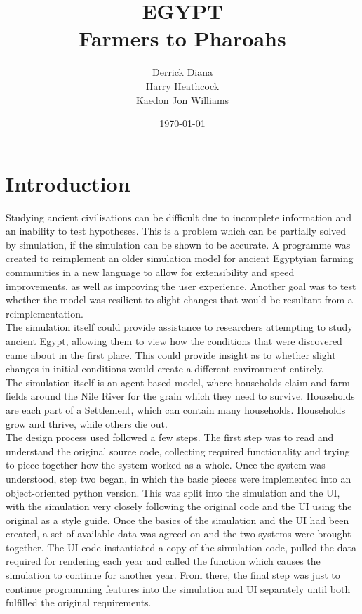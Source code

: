 \documentclass[12pt]{article}
\title{EGYPT\\Farmers to Pharoahs}
\author{Derrick Diana\\Harry Heathcock\\Kaedon Jon Williams}
\date{\today}
\begin{document}
	\maketitle
	\begin{abstract}
			
	\end{abstract}
	
	\section{Introduction}
		Studying ancient civilisations can be difficult due to incomplete information and an inability to test hypotheses. This is a problem which can be partially solved by simulation, if the simulation can be shown to be accurate. A programme was created to reimplement an older simulation model for ancient Egyptyian farming communities in a new language to allow for extensibility and speed improvements, as well as improving the user experience. Another goal was to test whether the model was resilient to slight changes that would be resultant from a reimplementation.\\
		The simulation itself could provide assistance to researchers attempting to study ancient Egypt, allowing them to view how the conditions that were discovered came about in the first place. This could provide insight as to whether slight changes in initial conditions would create a different environment entirely.\\
		The simulation itself is an agent based model, where households claim and farm fields around the Nile River for the grain which they need to survive. Households are each part of a Settlement, which can contain many households. Households grow and thrive, while others die out.\\
		The design process used followed a few steps. The first step was to read and understand the original source code, collecting required functionality and trying to piece together how the system worked as a whole. Once the system was understood, step two began, in which the basic pieces were implemented into an object-oriented python version. This was split into the simulation and the UI, with the simulation very closely following the original code and the UI using the original as a style guide. Once the basics of the simulation and the UI had been created, a set of available data was agreed on and the two systems were brought together. The UI code instantiated a copy of the simulation code, pulled the data required for rendering each year and called the function which causes the simulation to continue for another year. From there, the final step was just to continue programming features into the simulation and UI separately until both fulfilled the original requirements.
\end{document}
